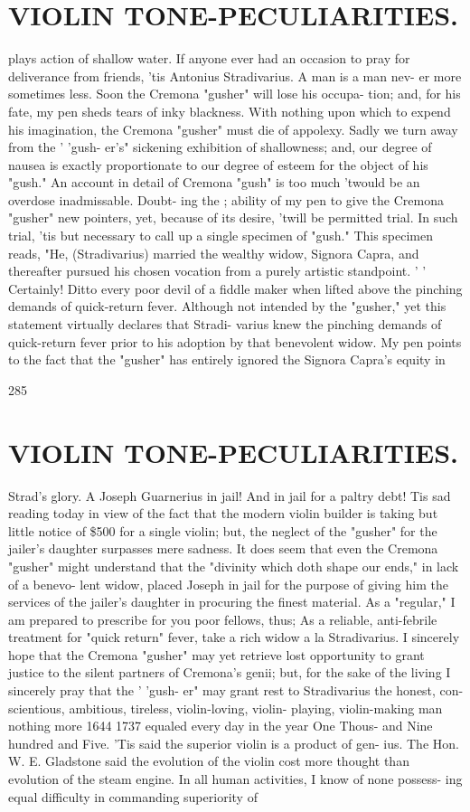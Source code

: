\documentclass{article}
\begin{document}
\section*{VIOLIN TONE-PECULIARITIES.}
plays action of shallow water. If anyone ever had an occasion to pray for deliverance from friends, 'tis Antonius Stradivarius. A man is a man nev- er more sometimes less. Soon the Cremona "gusher" will lose his occupa- tion; and, for his fate, my pen sheds tears of inky blackness. With nothing upon which to expend his imagination, the Cremona "gusher" must die of appolexy. Sadly we turn away from the ' 'gush- er's" sickening exhibition of shallowness; and, our degree of nausea is exactly proportionate to our degree of esteem for the object of his "gush." An account in detail of Cremona "gush" is too much 'twould be an overdose inadmissable. Doubt- ing the ; ability of my pen to give the Cremona "gusher" new pointers, yet, because of its desire, 'twill be permitted trial. In such trial, 'tis but necessary to call up a single specimen of "gush." This specimen reads, "He, (Stradivarius) married the wealthy widow, Signora Capra, and thereafter pursued his chosen vocation from a purely artistic standpoint. ' ' Certainly! Ditto every poor devil of a fiddle maker when lifted above the pinching demands of quick-return fever. Although not intended by the "gusher," yet this statement virtually declares that Stradi- varius knew the pinching demands of quick-return fever prior to his adoption by that benevolent widow. My pen points to the fact that the "gusher" has entirely ignored the Signora Capra's equity in

285

\section*{VIOLIN TONE-PECULIARITIES.}
Strad's glory. A Joseph Guarnerius in jail! And in jail for a paltry debt! Tis sad reading today in view of the fact that the modern violin builder is taking but little notice of \$500 for a single violin; but, the neglect of the "gusher" for the jailer's daughter surpasses mere sadness. It does seem that even the Cremona "gusher" might understand that the "divinity which doth shape our ends," in lack of a benevo- lent widow, placed Joseph in jail for the purpose of giving him the services of the jailer's daughter in procuring the finest material. As a "regular," I am prepared to prescribe for you poor fellows, thus; As a reliable, anti-febrile treatment for "quick return" fever, take a rich widow a la Stradivarius. I sincerely hope that the Cremona "gusher" may yet retrieve lost opportunity to grant justice to the silent partners of Cremona's genii; but, for the sake of the living I sincerely pray that the ' 'gush- er" may grant rest to Stradivarius the honest, con- scientious, ambitious, tireless, violin-loving, violin- playing, violin-making man nothing more 1644 1737 equaled every day in the year One Thous- and Nine hundred and Five. 'Tis said the superior violin is a product of gen- ius. The Hon. W. E. Gladstone said the evolution of the violin cost more thought than evolution of the steam engine. In all human activities, I know of none possess- ing equal difficulty in commanding superiority of
\end{document}
